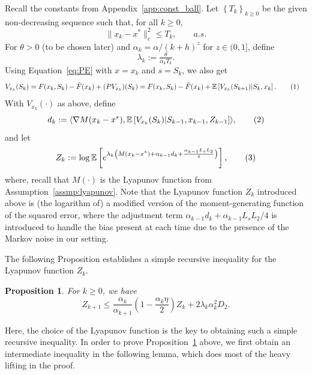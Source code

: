 \documentclass{article}
\newcommand{\numberthis}{\addtocounter{equation}{1}\tag{\theequation}}
\newcommand{\lrset}[1]{\left\{ #1 \right\}}
\newcommand{\lrp}[1]{\left( #1 \right)}
\newcommand{\lrs}[1]{\left[ #1 \right]}
\newcommand{\E}[1]{\mathbb{E}\lrs{#1}}
\newtheorem{proposition}[theorem]{Proposition}
\begin{document}
Recall the constants from Appendix~\ref{app:const_ball}. Let $\lrset{T_k}_{k\ge 0}$ be the given non-decreasing sequence such that, for all $k\geq 0$,
\[ \|x_k - x^*\|^2_c \le T_k, \qquad a.s. \]
For $\theta > 0$ (to be chosen later) and $\alpha_k = \alpha / (k+h)^z$ for $z\in (0,1]$, define
\[ \lambda_k :=  \tfrac{\theta}{\alpha_k T_k}. \]
Using Equation~\eqref{eq:PE} with $x = x_k$ and $s = S_k$, we also get
\begin{align*} 
    V_{x_k}(S_k) 
    &= F(x_k,S_k) - \bar{F}(x_k) + (PV_{x_k})(S_k) = F(x_k,S_k) - \bar{F}(x_k) + \E{V_{x_k}(S_{k+1})| S_{k}, x_{k}}.\numberthis\label{eq:PETerm}
\end{align*}
With $V_{x_k}(\cdot)$ as above, define 
\[ d_k := \langle \nabla M(x_k - x^*), \E{V_{x_k}(S_k) | S_{k-1}, x_{k-1}, Z_{k-1}} \rangle, \numberthis\label{eq:defdk}\]
and let 
\[ Z_k := \log \E{  e^{\lambda_{k}\lrp{M(x_{k} - x^*) + \alpha_{k-1} d_{k} + \frac{\alpha_{k-1} L_sL_2 }{4} }}  }, \numberthis\label{eq:defZk}\]
where, recall that $M(\cdot)$ is the Lyapunov function from Assumption~\ref{assmp:lyapunov}. Note that the Lyapunov function $Z_k$ introduced above is (the logarithm of) a modified version of the moment-generating function of the squared error, where the adjustment term $\alpha_{k-1}d_k + \alpha_{k-1}L_sL_2/4$ is introduced to handle the bias present at each time due to the presence of the Markov noise in our setting.


The following Proposition establishes a simple recursive inequality for the Lyapunov function $Z_k$.

\begin{proposition}\label{lem:rec2}
    For $k\ge 0$, we have
    \[ Z_{k+1}\le \frac{\alpha_k}{\alpha_{k+1}}\left(1- \frac{\alpha_k \eta}{2}\right) Z_k + 2 \lambda_k \alpha^2_k  D_2.\]
\end{proposition}

Here, the choice of the Lyapunov function is the key to obtaining such a simple recursive inequality. In order to prove Proposition~\ref{lem:rec2} above, we first obtain an intermediate inequality in the following lemma, which does most of the heavy lifting in the proof.
\end{document}
